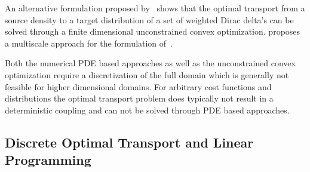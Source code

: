 \documentclass[twoside,11pt]{article}
\begin{document}
An alternative formulation proposed by~\citet{aurenhammer:algorithmica1998}
shows that the optimal transport from a source density to a target distribution
of a set of weighted Dirac delta's can be solved through a finite dimensional
unconstrained convex optimization. \citet{merigot:cgf2011} proposes a
multiscale approach for the formulation of~\citet{aurenhammer:algorithmica1998}.

Both the numerical PDE based approaches as well as the unconstrained convex
optimization require a discretization of the full domain which is generally not
feasible for higher dimensional domains. For arbitrary cost functions and
distributions the optimal transport problem does typically not result in a
deterministic coupling and can not be solved through PDE based approaches. 



\subsection{Discrete Optimal Transport and Linear Programming}
\label{sec:lp}
\end{document}
